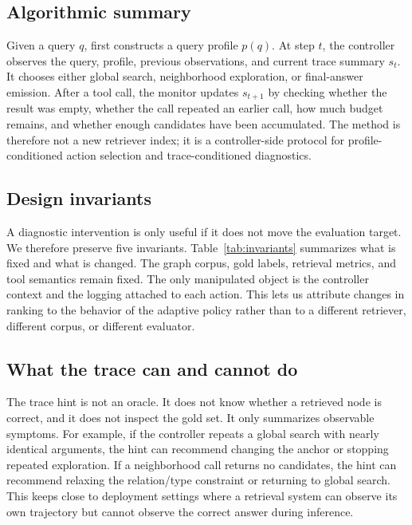 \subsection{Algorithmic summary}
Given a query $q$, \tb first constructs a query profile $p(q)$. At step $t$, the controller observes the query, profile, previous observations, and current trace summary $s_t$. It chooses either global search, neighborhood exploration, or final-answer emission. After a tool call, the monitor updates $s_{t+1}$ by checking whether the result was empty, whether the call repeated an earlier call, how much budget remains, and whether enough candidates have been accumulated. The method is therefore not a new retriever index; it is a controller-side protocol for profile-conditioned action selection and trace-conditioned diagnostics.

\subsection{Design invariants}
A diagnostic intervention is only useful if it does not move the evaluation target. We therefore preserve five invariants. Table~\ref{tab:invariants} summarizes what is fixed and what is changed. The graph corpus, gold labels, retrieval metrics, and tool semantics remain fixed. The only manipulated object is the controller context and the logging attached to each action. This lets us attribute changes in ranking to the behavior of the adaptive policy rather than to a different retriever, different corpus, or different evaluator.

\subsection{What the trace can and cannot do}
The trace hint is not an oracle. It does not know whether a retrieved node is correct, and it does not inspect the gold set. It only summarizes observable symptoms. For example, if the controller repeats a global search with nearly identical arguments, the hint can recommend changing the anchor or stopping repeated exploration. If a neighborhood call returns no candidates, the hint can recommend relaxing the relation/type constraint or returning to global search. This keeps \tb close to deployment settings where a retrieval system can observe its own trajectory but cannot observe the correct answer during inference.

